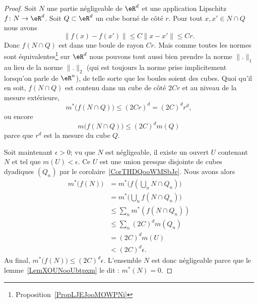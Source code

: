 \begin{proof}
	Soit \( N\) une partie négligeable de \( \eR^d\) et une application Lipschitz \( f\colon N\to \eR^d\). Soit \( Q\subset \eR^d\) un cube borné de côté \( r\). Pour tout \( x,x'\in N\cap Q\) nous avons
	\begin{equation}
		\| f(x)-f(x') \|\leq C\| x-x' \|\leq Cr.
	\end{equation}
	Donc \( f(N\cap Q)\) est dans une boule de rayon \( Cr\). Mais comme toutes les normes sont équivalentes\footnote{Proposition~\ref{PropLJEJooMOWPNi}} sur \( \eR^d\) nous pouvons tout aussi bien prendre la norme \( \| . \|_1\) au lieu de la norme \( \| . \|_2\) (qui est toujours la norme prise implicitement lorsqu'on parle de \( \eR^n\)), de telle sorte que les boules soient des cubes. Quoi qu'il en soit, \( f(N\cap Q)\) est contenu dans un cube de côté \( 2Cr\) et au niveau de la mesure extérieure,
	\begin{equation}
		m^*\big( f(N\cap Q) \big)\leq (2Cr)^d=(2C)^dr^d,
	\end{equation}
	ou encore
	\begin{equation}
		m\big(f(N\cap Q)\big)\leq (2C)^dm(Q)
	\end{equation}
	parce que \( r^d\) est la mesure du cube \( Q\).

	Soit maintenant \( \epsilon>0\); vu que \( N\) est négligeable, il existe un ouvert \( U\) contenant \( N\) et tel que \( m(U)<\epsilon\). Ce \( U\) est une union presque disjointe de cubes dyadiques \( (Q_n)\) par le corolaire~\ref{CorTHDQooWMSbJe}. Nous avons alors
	\begin{subequations}
		\begin{align}
			m^*\big( f(N) \big) & =m^*\big( f(\bigcup_nN\cap Q_n) \big) \\
			                    & =m^*\big( \bigcup_nf(N\cap Q_n) \big) \\
			                    & \leq \sum_nm^*(f(N\cap Q_n))          \\
			                    & \leq \sum_n(2C)^dm(Q_n)               \\
			                    & =(2C)^dm(U)                           \\
			                    & <(2C)^d\epsilon.
		\end{align}
	\end{subequations}
	Au final, \( m^*\big( f(N) \big)\leq (2C)^d\epsilon\).  L'ensemble \( N\) est donc négligeable parce que le lemme~\ref{LemXOUNooUbtpxm} le dit : \( m^*(N)=0\).
\end{proof}

